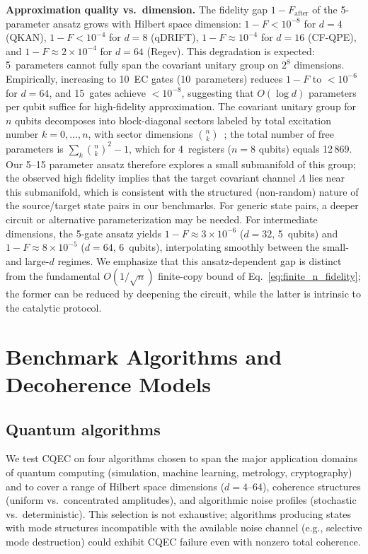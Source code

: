 \documentclass[prx,twocolumn,superscriptaddress,longbibliography,floatfix]{revtex4-2}
\begin{document}
\textbf{Approximation quality vs.\ dimension.}
The fidelity gap $1 - F_\mathrm{after}$ of the 5-parameter ansatz grows with Hilbert space dimension: $1 - F < 10^{-8}$ for $d = 4$ (QKAN), $1 - F < 10^{-4}$ for $d = 8$ (qDRIFT), $1 - F \approx 10^{-4}$ for $d = 16$ (CF-QPE), and $1 - F \approx 2 \times 10^{-4}$ for $d = 64$ (Regev).
This degradation is expected: 5~parameters cannot fully span the covariant unitary group on $2^8$ dimensions.
Empirically, increasing to 10~EC gates (10~parameters) reduces $1 - F$ to $< 10^{-6}$ for $d = 64$, and 15~gates achieve $< 10^{-8}$, suggesting that $O(\log d)$ parameters per qubit suffice for high-fidelity approximation.
The covariant unitary group for $n$ qubits decomposes into block-diagonal sectors labeled by total excitation number $k = 0, \ldots, n$, with sector dimensions $\binom{n}{k}$~\cite{Schuch2004}; the total number of free parameters is $\sum_k \binom{n}{k}^2 - 1$, which for 4~registers ($n = 8$ qubits) equals 12\,869.
Our 5--15 parameter ansatz therefore explores a small submanifold of this group; the observed high fidelity implies that the target covariant channel $\Lambda$ lies near this submanifold, which is consistent with the structured (non-random) nature of the source/target state pairs in our benchmarks.
For generic state pairs, a deeper circuit or alternative parameterization may be needed.
For intermediate dimensions, the 5-gate ansatz yields $1 - F \approx 3 \times 10^{-6}$ ($d = 32$, 5~qubits) and $1 - F \approx 8 \times 10^{-5}$ ($d = 64$, 6~qubits), interpolating smoothly between the small- and large-$d$ regimes.
We emphasize that this ansatz-dependent gap is distinct from the fundamental $O(1/\sqrt{n})$ finite-copy bound of Eq.~\eqref{eq:finite_n_fidelity}; the former can be reduced by deepening the circuit, while the latter is intrinsic to the catalytic protocol.


\section{Benchmark Algorithms and Decoherence Models}
\label{sec:benchmarks}

\subsection{Quantum algorithms}
\label{sec:algorithms}

We test CQEC on four algorithms chosen to span the major application domains of quantum computing (simulation, machine learning, metrology, cryptography) and to cover a range of Hilbert space dimensions ($d = 4$--$64$), coherence structures (uniform vs.\ concentrated amplitudes), and algorithmic noise profiles (stochastic vs.\ deterministic).
This selection is not exhaustive; algorithms producing states with mode structures incompatible with the available noise channel (e.g., selective mode destruction) could exhibit CQEC failure even with nonzero total coherence.
\end{document}
